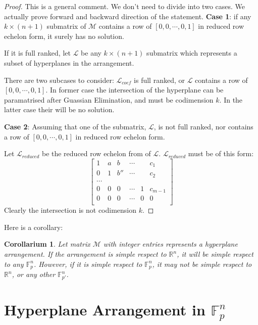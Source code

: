 \documentclass[12pt, a4paper]{article}
\newtheorem{corollary}[theorem]{Corollarium}
\theoremstyle{definition}
\theoremstyle{remark}
\newcommand{\bb}[1]{\mathbb{#1}}
\begin{document}
\begin{proof}
{\color{red} This is a general comment. We don't need to divide into two cases. We actually prove forward and backward direction of the statement.}
	\textbf{Case 1}: if any $k\times (n+1)$ submatrix of $\mathcal{M}$ contains a row of $[0, 0, \cdots, 0, 1]$ in reduced row echelon form, it surely has no solution. 

	If it is full ranked, 
	let $\mathcal{L}$ be any $k \times (n+1)$ submatrix which represents a subset of hyperplanes in the arrangement.

	There are two subcases to consider: $\mathcal{L}_{coef}$  is full ranked, or $\mathcal{L}$ contains a row of $[0,0,\cdots , 0 ,1]$. 
	In former case the intersection of the hyperplane can be paramatrised after Guassian Elimination, and must be codimension $k$. In the latter case their will be no solution.

	\textbf{Case 2}: Assuming that one of the submatrix, $\mathcal{L}$, is not full ranked, nor contains a row of $[0, 0, \cdots, 0, 1]$ in reduced row echelon form.

	Let $\mathcal{L}_{reduced}$ be the reduced row echelon from of $\mathcal{L}$.
		 $\mathcal{L}_{reduced}$ must be of this form:
			$$
			\begin{bmatrix}
				1 & a & b & \cdots &  &  c_1\\
				0 & 1 & b'' & \cdots &  &  c_2\\
				\cdots \\
				0 & 0 & 0 & \cdots & 1 &  c_{m-1}\\
				0 & 0 & 0 & \cdots & 0 & 0 \\
			\end{bmatrix}
			$$
	Clearly the intersection is not codimension $k$.
\end{proof}

Here is a corollary:

\begin{corollary}
	Let matrix $\mathcal{M}$ with integer entries represents a hyperplane arrangement.
	If the arrangement is simple respect to $\bb{R}^n$, it will be simple respect to any $\mathbb{F}_p^n$. 
	However, if it is simple respect to $\mathbb{F}_p^n$, it may not be simple respect to $\bb{R}^n$, or any other $\mathbb{F}_{p'}^n$.
\end{corollary}

\section{Hyperplane Arrangement in $\mathbb{F}_p^n$}
\end{document}
